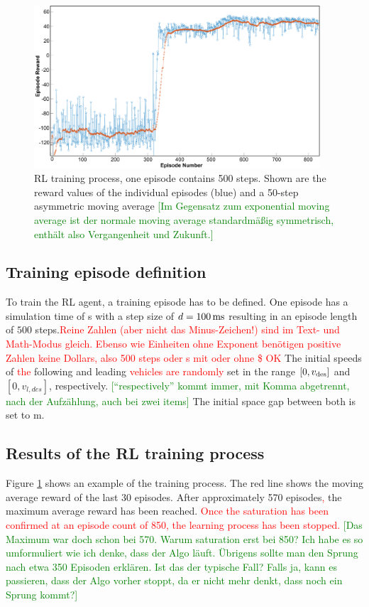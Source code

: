 \documentclass[review]{elsarticle}
\providecommand{\red}[1]{\textcolor{red}{#1}}
\providecommand{\green}[1]{\textcolor{green}{#1}}
\providecommand{\martin}[1]{\red{#1}} %
\providecommand{\martinc}[1]{\green{[#1]}} %
\providecommand{\3}{{\ss}}
\begin{document}
\begin{figure}
	\centering
	\includegraphics[width=0.95\textwidth]{images/Training}
	\caption{RL training process, one episode contains 500
          steps. Shown are the reward values of the individual
          episodes (blue) and a 50-step asymmetric moving average
          \martinc{Im Gegensatz zum exponential moving average ist der
          normale moving average standardm\"a\3ig symmetrisch,
          enth\"alt also Vergangenheit und Zukunft.}}
	\label{fig:training}
\end{figure}

\subsection{Training episode definition}

To train the RL agent, a training episode has to be defined. One
episode has a simulation time of \unit[50]{s} with a step size of
$d=\unit[100]{ms}$ resulting in an episode length of $500$
steps.\martin{Reine Zahlen (aber nicht das Minus-Zeichen!) sind im Text- und Math-Modus gleich. Ebenso
  wie Einheiten ohne Exponent ben\"otigen positive Zahlen keine Dollars, also 500
  steps oder \unit[50]{s} mit oder ohne \$ OK}   The initial
speeds of \martin{the} following and leading \martin{vehicles are
  randomly}  set in the range $[0,v_{\rm des}]$ and $[0,v_{l,des}]$,
respectively. \martinc{``respectively'' kommt immer, mit Komma
  abgetrennt, nach der Aufz\"ahlung, auch bei zwei items} The initial
space gap between both is set to \unit[120]{m}. 

\subsection{Results of the RL training process}

Figure \ref{fig:training} shows an example of the training
process. The red line shows the moving average reward of the last 30
episodes. After approximately 570 episodes\martin{,} the maximum
average reward has been reached. \martin{Once the saturation has been
confirmed at an episode count of 850, the learning
process has been stopped.} \martinc{Das Maximum war
  doch schon bei 570. Warum saturation erst bei 850? Ich habe es so
  umformuliert wie ich denke, dass der Algo l\"auft. \"Ubrigens sollte
  man den Sprung nach etwa 350 Episoden erkl\"aren. Ist das der
  typische Fall? Falls ja, kann es passieren, dass der Algo vorher
  stoppt, da er nicht mehr denkt, dass noch ein Sprung kommt?}
\end{document}
